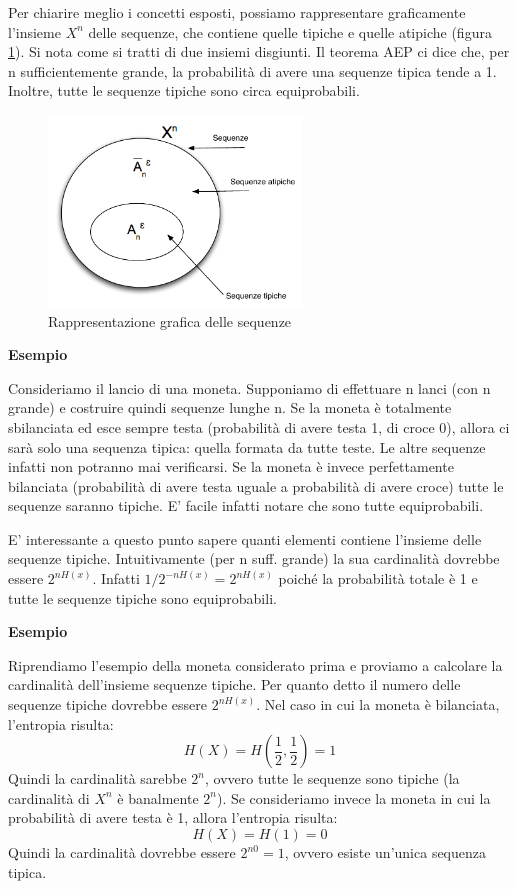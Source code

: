 Per chiarire meglio i concetti esposti, possiamo rappresentare graficamente l'insieme $X^n$ delle sequenze, che 
contiene quelle tipiche e quelle atipiche (figura \ref{fig:sequenze}).
Si nota come si tratti di due insiemi disgiunti. Il teorema AEP ci dice che, per n sufficientemente grande, la probabilità 
di avere una sequenze tipica tende a 1. Inoltre, tutte le sequenze tipiche sono circa equiprobabili.

\begin{figure}[htbp]
\begin{center}
	\includegraphics[width=0.6\textwidth]{img/sequenze.pdf}
\caption{Rappresentazione grafica delle sequenze}
\label{fig:sequenze}
\end{center}
\end{figure}

\bigskip
\noindent
\textbf{Esempio}

\noindent
Consideriamo il lancio di una moneta. Supponiamo di effettuare n lanci (con n grande) e costruire quindi sequenze lunghe n.
Se la moneta è totalmente sbilanciata ed esce sempre testa (probabilità di avere testa 1, di croce 0), allora ci sarà solo una sequenza
tipica: quella formata da tutte teste. Le altre sequenze infatti non potranno mai verificarsi.
Se la moneta è invece perfettamente bilanciata (probabilità di avere testa uguale a probabilità di avere croce) tutte le sequenze 
saranno tipiche. E' facile infatti notare che sono tutte equiprobabili.

\bigskip
E' interessante a questo punto sapere quanti elementi contiene l'insieme delle sequenze tipiche. Intuitivamente (per n suff. grande) la
sua cardinalità dovrebbe essere $2^{nH(x)}$. Infatti $1/2^{-nH(x)}=2^{nH(x)}$ poiché la probabilità totale è 1 e tutte le sequenze 
tipiche sono equiprobabili.

\bigskip
\noindent
\textbf{Esempio}

\noindent
Riprendiamo l'esempio della moneta considerato prima e proviamo a calcolare la cardinalità dell'insieme sequenze tipiche.
Per quanto detto il numero delle sequenze tipiche dovrebbe essere $2^{nH(x)}$.
Nel caso in cui la moneta è bilanciata, l'entropia risulta:
\[
 H(X)=H \left( \frac{1}{2},\frac{1}{2} \right)=1
\]
Quindi la cardinalità sarebbe $2^n$, ovvero tutte le sequenze sono tipiche (la cardinalità di $X^n$ è banalmente $2^n$).
Se consideriamo invece la moneta in cui la probabilità di avere testa è 1, allora l'entropia risulta:
\[
 H(X)=H \left(1\right)=0
\]
Quindi la cardinalità dovrebbe essere $2^{n0}=1$, ovvero esiste un'unica sequenza tipica.

